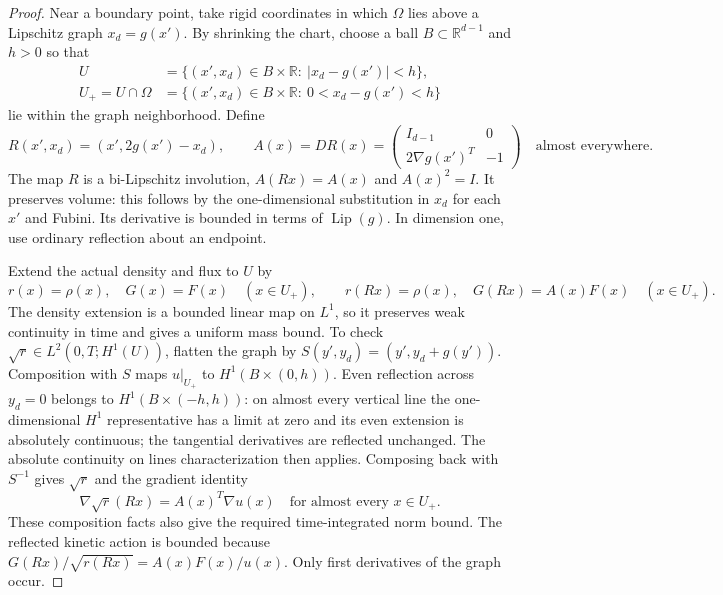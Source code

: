 \documentclass[11pt]{article}
\newcommand{\R}{\mathbb R}
\newcommand{\grad}{\nabla}
\DeclareMathOperator{\Lip}{Lip}
\begin{document}
\begin{proof}
Near a boundary point, take rigid coordinates in which
$\Omega$ lies above a Lipschitz graph $x_d=g(x')$.
By shrinking the chart, choose a ball $B\subset\R^{d-1}$ and $h>0$ so that
\begin{align*}
 U&=\{(x',x_d)\in B\times\R:\ |x_d-g(x')|<h\},\\
 U_+=U\cap\Omega&=\{(x',x_d)\in B\times\R:\ 0<x_d-g(x')<h\}
\end{align*}
lie within the graph neighborhood. Define
\begin{equation}\label{eq:reflection}
 R(x',x_d)=(x',2g(x')-x_d),\qquad
 A(x)=DR(x)=
 \begin{pmatrix} I_{d-1}&0\\2\grad g(x')^T&-1\end{pmatrix}
 \quad\text{almost everywhere}.
\end{equation}
The map $R$ is a bi-Lipschitz involution, $A(Rx)=A(x)$ and $A(x)^2=I$.
It preserves volume: this follows by the one-dimensional substitution in
$x_d$ for each $x'$ and Fubini. Its derivative is bounded in terms of
$\Lip(g)$. In dimension one, use ordinary reflection about an endpoint.

Extend the actual density and flux to $U$ by
\begin{equation}\label{eq:extension}
 r(x)=\rho(x),\quad G(x)=F(x)\quad(x\in U_+),\qquad
 r(Rx)=\rho(x),\quad G(Rx)=A(x)F(x)\quad(x\in U_+).
\end{equation}
The density extension is a bounded linear map on $L^1$, so it preserves weak
continuity in time and gives a uniform mass bound.
To check $\sqrt r\in L^2(0,T;H^1(U))$, flatten the graph by
$S(y',y_d)=(y',y_d+g(y'))$. Composition with $S$ maps $u|_{U_+}$ to
$H^1(B\times(0,h))$. Even reflection across $y_d=0$ belongs to
$H^1(B\times(-h,h))$: on almost every vertical line the one-dimensional
$H^1$ representative has a limit at zero and its even extension is
absolutely continuous; the tangential derivatives are reflected unchanged.
The absolute continuity on lines characterization then applies. Composing
back with $S^{-1}$ gives $\sqrt r$ and the gradient identity
\begin{equation}\label{eq:reflected-gradient}
 \grad\sqrt r(Rx)=A(x)^T\grad u(x)\quad\text{for almost every }x\in U_+.
\end{equation}
These composition facts also give the required time-integrated norm bound.
The reflected kinetic action is bounded because $G(Rx)/\sqrt{r(Rx)}=A(x)F(x)/u(x)$.
Only first derivatives of the graph occur.


\end{proof}
\end{document}
